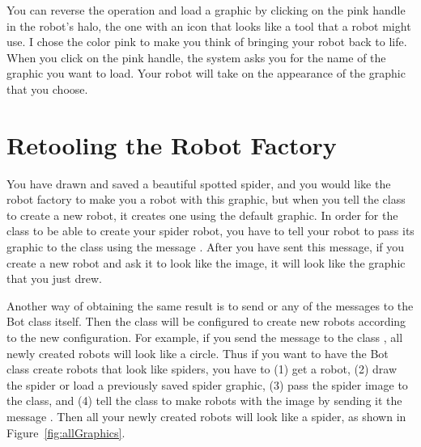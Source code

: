 \documentclass[a4paper,10pt,twoside]{book}
\begin{document}
You can reverse the operation and load a graphic by clicking on the pink handle in the 
robot’s halo, the one with an icon that looks like a tool that a robot might use. I chose the color 
pink to make you think of bringing your robot back to life. When you click on the pink handle, 
the system asks you for the name of the graphic you want to load. Your robot will take on the 
appearance of the graphic that you choose.

\section{Retooling the Robot Factory}

You have drawn and saved a beautiful spotted spider, and you would like the robot factory 
to make you a robot with this graphic, but when you tell the  class to create a new robot, 
it creates one using the default graphic. In order for the  class to be able to create your 
spider robot, you have to tell your robot to pass its graphic to the class using the message 
. After you have sent this message, if you create a new robot and ask it to 
look like the image, it will look like the graphic that you just drew. 

Another way of obtaining the same result is to send  or any of the 
messages to the Bot class itself. Then the class will be configured to create new robots according to the new configuration. For example, if you send the message  to the 
class , all newly created robots will look like a circle. Thus if you want to have the Bot class 
create robots that look like spiders, you have to (1) get a robot, (2) draw the spider or load a 
previously saved spider graphic, (3) pass the spider image to the class, and (4) tell the class to 
make robots with the image by sending it the message . Then all your newly 
created robots will look like a spider, as shown in Figure~\ref{fig:allGraphics}.
\end{document}
